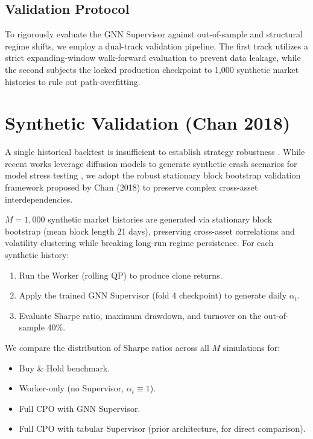 \documentclass[conferences]{IEEEtran}
\begin{document}
\subsection{Validation Protocol}
To rigorously evaluate the GNN Supervisor against out-of-sample and structural regime shifts, we employ a dual-track validation pipeline. The first track utilizes a strict expanding-window walk-forward evaluation to prevent data leakage, while the second subjects the locked production checkpoint to 1,000 synthetic market histories to rule out path-overfitting.


\section{Synthetic Validation (Chan 2018)}

A single historical backtest is insufficient to establish strategy robustness \cite{chan2018}. While recent works leverage diffusion models to generate synthetic crash scenarios for model stress testing \cite{choudhary2025}, we adopt the robust stationary block bootstrap validation framework proposed by Chan (2018) to preserve complex cross-asset interdependencies.

$M = 1{,}000$ synthetic market histories are generated via stationary block bootstrap (mean block length 21 days), preserving cross-asset correlations and volatility clustering while breaking long-run regime persistence. For each synthetic history:
\begin{enumerate}
    \item Run the Worker (rolling QP) to produce clone returns.
    \item Apply the trained GNN Supervisor (fold 4 checkpoint) to generate daily $\alpha_t$.
    \item Evaluate Sharpe ratio, maximum drawdown, and turnover on the out-of-sample 40\%.
\end{enumerate}

We compare the distribution of Sharpe ratios across all $M$ simulations for:
\begin{itemize}
    \item Buy \& Hold benchmark.
    \item Worker-only (no Supervisor, $\alpha_t \equiv 1$).
    \item Full CPO with GNN Supervisor.
    \item Full CPO with tabular Supervisor (prior architecture, for direct comparison).
\end{itemize}
\end{document}
